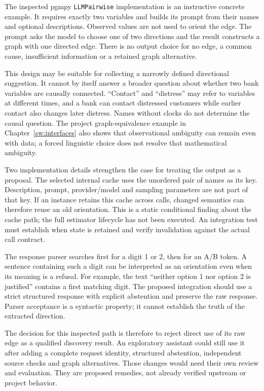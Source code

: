 The inspected pgmpy \texttt{LLMPairwise} implementation is an instructive
concrete example. It requires exactly two variables and builds its prompt from
their names and optional descriptions. Observed values are not used to orient
the edge. The prompt asks the model to choose one of two directions and the
result constructs a graph with one directed edge. There is no output choice
for no edge, a common cause, insufficient information or a retained graph
alternative.\cite{v12_sw_pgmpy}

This design may be suitable for collecting a narrowly defined directional
suggestion. It cannot by itself answer a broader question about whether two
bank variables are causally connected. ``Contact'' and ``distress'' may refer
to variables at different times, and a bank can contact distressed customers
while earlier contact also changes later distress. Names without clocks do
not determine the causal question. The project graph-equivalence example in
Chapter~\ref{sw:interfaces} also shows that observational ambiguity can remain
even with data; a forced linguistic choice does not resolve that mathematical
ambiguity.

Two implementation details strengthen the case for treating the output as a
proposal. The selected internal cache uses the unordered pair of names as its
key. Description, prompt, provider/model and sampling parameters are not part
of that key. If an instance retains this cache across calls, changed semantics
can therefore reuse an old orientation. This is a static conditional finding
about the cache path; the full estimator lifecycle has not been executed.
An integration test must establish when state is retained and verify
invalidation against the actual call contract.\cite{v12_sw_pgmpy}

The response parser searches first for a digit 1 or 2, then for an A/B token.
A sentence containing such a digit can be interpreted as an orientation even
when its meaning is a refusal. For example, the text ``neither option 1 nor
option 2 is justified'' contains a first matching digit. The proposed
integration should use a strict structured response with explicit abstention
and preserve the raw response. Parser acceptance is a syntactic property;
it cannot establish the truth of the extracted direction.

The decision for this inspected path is therefore to reject direct use of its
raw edge as a qualified discovery result. An exploratory assistant could still
use it after adding a complete request identity, structured abstention,
independent source checks and graph alternatives. Those changes would need
their own review and evaluation. They are proposed remedies, not already
verified upstream or project behavior.

